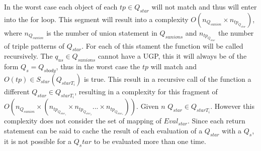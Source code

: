  In the worst case each object of each $tp \in Q_{star}$ will not match and thus will enter into the for loop.
 This segment will result into a complexity $O(n_{Q_{sunion}} \times n_{tp_{ Q_{star}}})$, 
 where $n_{Q_{sunion}}$ is the number of union statement in $Q_{sunions}$ and $n_{tp_{ Q_{star}}}$ the number of triple patterns
 of $Q_{star}$.
 For each of this stament the function will be called recursively.
 The $q_{us} \in Q_{sunions}$ cannot have a UGP, this it will always be of the form $Q_s = Q_{sbody}$, thus in the worst case
 the $tp$ will match and $O(tp) \in  S_{star}(Q_{starT_i})$ is true.
 This result in a recursive call of the function a different $Q_{star} \in Q_{starT_i}$, resulting in a 
 complexity for this fragment of $O(n_{Q_{sunion}} \times ( n_{tp_{ Q_{star_1}}} \times n_{tp_{ Q_{star_2}}} ... \times n_{tp_{ Q_{star_n}}}))$.
 Given $n$  $Q_{star} \in Q_{starT_i}$.
 However this complexity does not consider the set of mapping of $Eval_{star}$.
 Since each return statement can be said to cache the result of each evaluation of a
 $Q_{star}$ with a $Q_s$, it is not possible for a $Q_star$ to be evaluated more than one time.